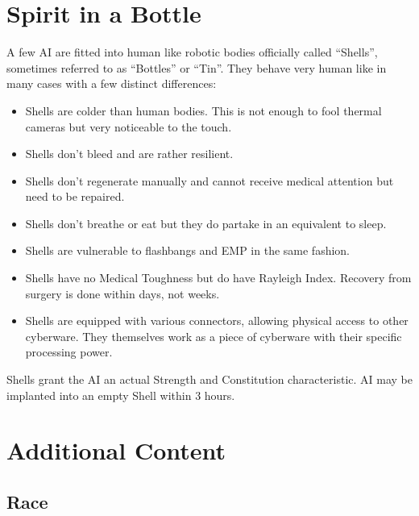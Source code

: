 \documentclass[12pt,a4paper]{book}
\begin{document}
	\chapter{Spirit in a Bottle}
	A few AI are fitted into human like robotic bodies officially called “Shells”, sometimes referred to as “Bottles” or “Tin”. They behave very human like in many cases with a few distinct differences:
	\begin{itemize}
		\item Shells are colder than human bodies. This is not enough to fool thermal cameras but very noticeable to the touch.
		\item Shells don’t bleed and are rather resilient.
		\item Shells don’t regenerate manually and cannot receive medical attention but need to be repaired.
		\item Shells don’t breathe or eat but they do partake in an equivalent to sleep.
		\item Shells are vulnerable to flashbangs and EMP in the same fashion.
		\item Shells have no Medical Toughness but do have Rayleigh Index. Recovery from surgery is done within days, not weeks.
		\item Shells are equipped with various connectors, allowing physical access to other cyberware. They themselves work as a piece of cyberware with their specific processing power.
	\end{itemize}
	
	Shells grant the AI an actual Strength and Constitution characteristic. AI may be implanted into an empty Shell within 3 hours.
	
	\chapter{Additional Content}
	\section{Race}
	
\end{document}

